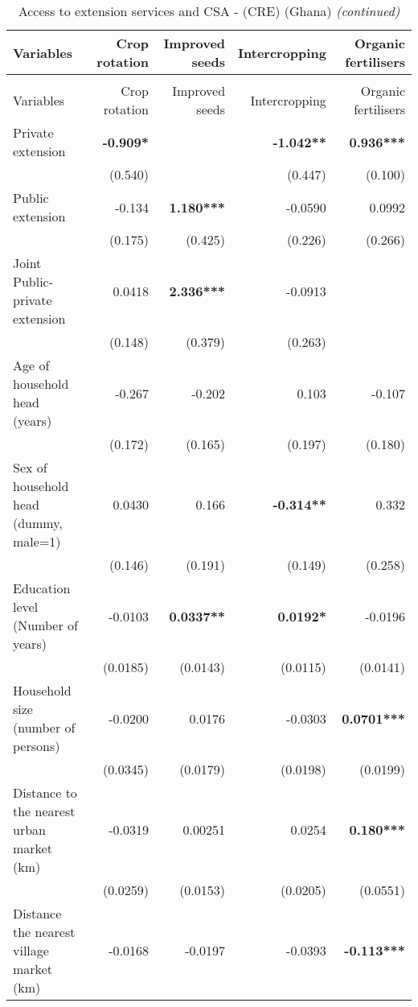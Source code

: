 \documentclass[
]{article}
\begin{document}
\newpage

\begingroup\fontsize{7}{9}\selectfont

\begin{longtable}[t]{lrrrr}
\caption{\label{tab:unnamed-chunk-4}Access to extension services and CSA - (CRE) (Ghana)}\\
\toprule
Variables & Crop rotation & Improved seeds & Intercropping & Organic fertilisers\\
\midrule
\endfirsthead
\caption[]{\label{tab:unnamed-chunk-4}Access to extension services and CSA - (CRE) (Ghana) \textit{(continued)}}\\
\toprule
Variables & Crop rotation & Improved seeds & Intercropping & Organic fertilisers\\
\midrule
\endhead

\endfoot
\bottomrule
\endlastfoot
Private extension & \textbf{-0.909*} &  & \textbf{-1.042**} & \textbf{0.936***}\\
 & (0.540) &  & (0.447) & (0.100)\\
Public extension & -0.134 & \textbf{1.180***} & -0.0590 & 0.0992\\
 & (0.175) & (0.425) & (0.226) & (0.266)\\
Joint Public-private extension & 0.0418 & \textbf{2.336***} & -0.0913 & \\
 & (0.148) & (0.379) & (0.263) & \\
Age of household head (years) & -0.267 & -0.202 & 0.103 & -0.107\\
 & (0.172) & (0.165) & (0.197) & (0.180)\\
Sex of household head (dummy, male=1) & 0.0430 & 0.166 & \textbf{-0.314**} & 0.332\\
 & (0.146) & (0.191) & (0.149) & (0.258)\\
Education level (Number of years) & -0.0103 & \textbf{0.0337**} & \textbf{0.0192*} & -0.0196\\
 & (0.0185) & (0.0143) & (0.0115) & (0.0141)\\
Household size (number of persons) & -0.0200 & 0.0176 & -0.0303 & \textbf{0.0701***}\\
 & (0.0345) & (0.0179) & (0.0198) & (0.0199)\\
Distance to the nearest urban market (km) & -0.0319 & 0.00251 & 0.0254 & \textbf{0.180***}\\
 & (0.0259) & (0.0153) & (0.0205) & (0.0551)\\
Distance the nearest village market (km) & -0.0168 & -0.0197 & -0.0393 & \textbf{-0.113***}\\

\end{longtable}
\end{document}
